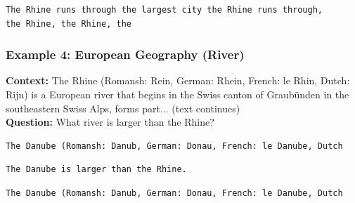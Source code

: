\begin{tcolorbox}[colback=gray!5!white, colframe=gray!75!black, title=\textbf{xLSTM (No Cache)}]
\begin{verbatim}
The Rhine runs through the largest city the Rhine runs through, 
the Rhine, the Rhine, the
\end{verbatim}
\end{tcolorbox}

\vspace{1em}

\subsubsection{Example 4: European Geography (River)}

\begin{tcolorbox}[colback=blue!5!white, colframe=blue!75!black, title=Prompt]
\textbf{Context:} The Rhine (Romansh: Rein, German: Rhein, French: le Rhin, Dutch: Rijn) is a European river 
that begins in the Swiss canton of Graubünden in the southeastern Swiss Alps, forms part... (text continues)\\
\textbf{Question:} What river is larger than the Rhine?
\end{tcolorbox}

\begin{tcolorbox}[colback=gray!5!white, colframe=gray!75!black, title=\textbf{xLSTM (Cache)}]
\begin{verbatim}
The Danube (Romansh: Danub, German: Donau, French: le Danube, Dutch
\end{verbatim}
\end{tcolorbox}

\begin{tcolorbox}[colback=gray!5!white, colframe=gray!75!black, title=\textbf{Mistral}]
\begin{verbatim}
The Danube is larger than the Rhine.
\end{verbatim}
\end{tcolorbox}

\begin{tcolorbox}[colback=gray!5!white, colframe=gray!75!black, title=\textbf{xLSTM (No Cache)}]
\begin{verbatim}
The Danube (Romansh: Danub, German: Donau, French: le Danube, Dutch
\end{verbatim}
\end{tcolorbox}


